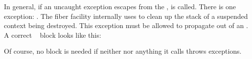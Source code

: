 \label{exceptions}

In general, if an uncaught exception escapes from the \entryfn,
 is called. There is one exception: \unwindex. The fiber
facility internally uses \unwindex to clean up the stack of a suspended context
being destroyed. This exception must be allowed to propagate out of an \entryfn.\\

A correct \entryfn\  block looks like this:

Of course, no  block is needed if neither \entryfn\xspace nor
anything it calls throws exceptions.
